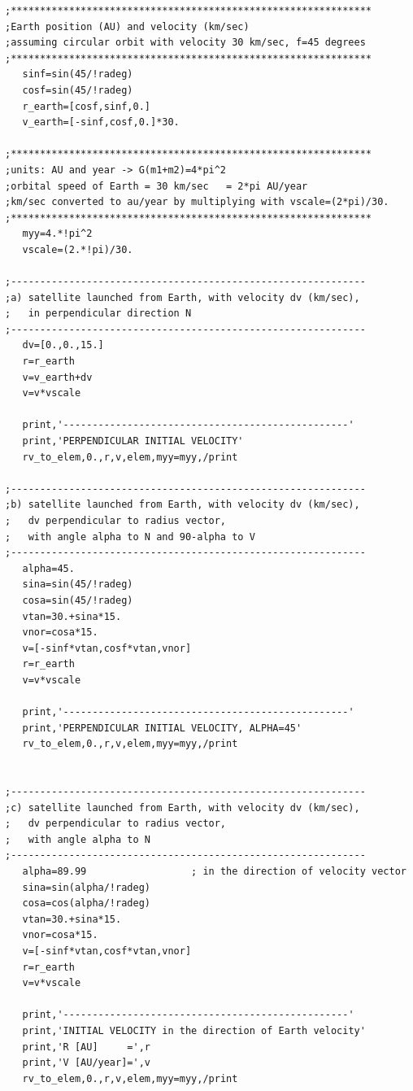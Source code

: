 \documentclass[a4paper,12pt]{article}
\begin{document}
{{{{\begin{verbatim}
;**************************************************************
;Earth position (AU) and velocity (km/sec)
;assuming circular orbit with velocity 30 km/sec, f=45 degrees
;**************************************************************
   sinf=sin(45/!radeg)
   cosf=sin(45/!radeg)
   r_earth=[cosf,sinf,0.]
   v_earth=[-sinf,cosf,0.]*30.

;**************************************************************
;units: AU and year -> G(m1+m2)=4*pi^2
;orbital speed of Earth = 30 km/sec   = 2*pi AU/year
;km/sec converted to au/year by multiplying with vscale=(2*pi)/30.
;**************************************************************
   myy=4.*!pi^2
   vscale=(2.*!pi)/30.

;-------------------------------------------------------------
;a) satellite launched from Earth, with velocity dv (km/sec),
;   in perpendicular direction N
;-------------------------------------------------------------
   dv=[0.,0.,15.]
   r=r_earth
   v=v_earth+dv
   v=v*vscale

   print,'-------------------------------------------------'
   print,'PERPENDICULAR INITIAL VELOCITY'
   rv_to_elem,0.,r,v,elem,myy=myy,/print

;-------------------------------------------------------------
;b) satellite launched from Earth, with velocity dv (km/sec),
;   dv perpendicular to radius vector,
;   with angle alpha to N and 90-alpha to V
;-------------------------------------------------------------
   alpha=45.
   sina=sin(45/!radeg)
   cosa=sin(45/!radeg)
   vtan=30.+sina*15.
   vnor=cosa*15.
   v=[-sinf*vtan,cosf*vtan,vnor]
   r=r_earth
   v=v*vscale

   print,'-------------------------------------------------'
   print,'PERPENDICULAR INITIAL VELOCITY, ALPHA=45'
   rv_to_elem,0.,r,v,elem,myy=myy,/print


;-------------------------------------------------------------
;c) satellite launched from Earth, with velocity dv (km/sec),
;   dv perpendicular to radius vector,
;   with angle alpha to N
;-------------------------------------------------------------
   alpha=89.99                  ; in the direction of velocity vector
   sina=sin(alpha/!radeg)
   cosa=cos(alpha/!radeg)
   vtan=30.+sina*15.
   vnor=cosa*15.   
   v=[-sinf*vtan,cosf*vtan,vnor]
   r=r_earth
   v=v*vscale

   print,'-------------------------------------------------'
   print,'INITIAL VELOCITY in the direction of Earth velocity'
   print,'R [AU]     =',r
   print,'V [AU/year]=',v
   rv_to_elem,0.,r,v,elem,myy=myy,/print



\end{verbatim}}}}}
\end{document}
